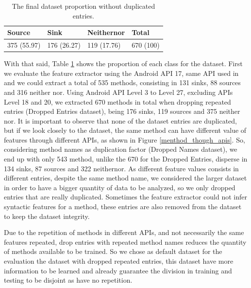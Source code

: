 \begin{table}[hb!]
    \centering
    \renewcommand{\arraystretch}{1.8}
    \begin{tabular}{p{2.5cm}p{2.5cm}p{2.5cm}p{2cm} }
        \toprule
        Source & Sink & Neithernor & Total\\
        \midrule
        375 (55.97) & 176 (26.27) & 119 (17.76) & 670 (100)\\ [1ex]
        \bottomrule
        \end{tabular}
        \caption{%
        The final dataset proportion without duplicated entries.%
        }\label{dset_prop}
\end{table}

With that said, Table \ref{dset_prop} shows the proportion of each class for the dataset. First we evaluate the feature extractor using the Android API 17, same API used in \cite{rasthofer2014machine} and we could extract a total of 535 methods, consisting in 131 sinks, 88 sources and 316 neither nor. Using Android API Level 3 to Level 27, excluding APIs Level 18 and 20, we extracted 670 methods in total when dropping repeated entries (Dropped Entries dataset), being 176 sinks, 119 sources and 375 neither nor. It is important to observe that none of the dataset entries are duplicated, but if we look closely to the dataset, the same method can have different value of features through different APIs, as shown in Figure \ref{menthod_though_apis}. So, considering method names as duplication factor (Dropped Names dataset), we end up with only 543 method, unlike the 670 for the Dropped Entries, disperse in 134 sinks, 87 sources and 322 neithernor. As different feature values consists in different entries, despite the same method name, we considered the larger dataset in order to have a bigger quantity of data to be analyzed, so we only dropped entries that are really duplicated. Sometimes the feature extractor could not infer syntactic features for a method, these entries are also removed from the dataset to keep the dataset integrity.

Due to the repetition of methods in different APIs, and not necessarily the same features repeated, drop entries with repeated method names reduces the quantity of methods available to be trained. So we chose as default dataset for the evaluation the dataset with dropped repeated entries, this dataset have more information to be learned and already guarantee the division in training and testing to be disjoint as have no repetition.

